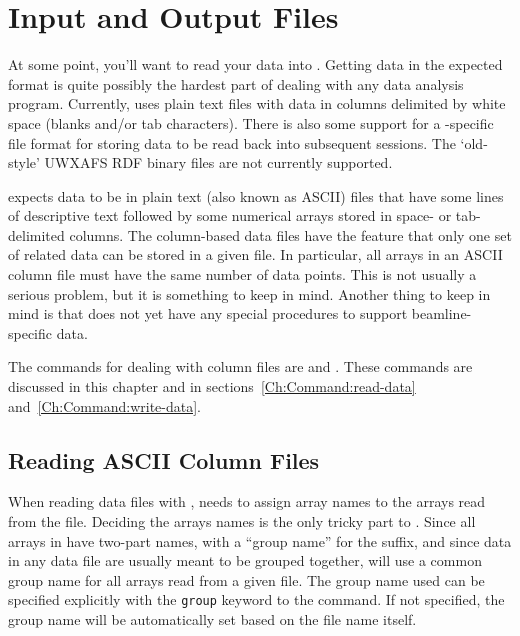 \section{Input and Output Files} \label{Ch:IO}

At some point, you'll want to read your data into {\ifeffit}.  Getting data
in the expected format is quite possibly the hardest part of dealing with
any data analysis program.  Currently, {\ifeffit} uses plain text files
with data in columns delimited by white space (blanks and/or tab
characters).  There is also some support for a {\ifeffit}-specific file
format for storing data to be read back into subsequent {\ifeffit}
sessions.  The `old-style' UWXAFS RDF binary files are not currently
supported.  {}

{\ifeffit} expects data to be in plain text (also known as ASCII) files
that have some lines of descriptive text followed by some numerical arrays
stored in space- or tab-delimited columns.  The column-based data files
have the feature that only one set of related data can be stored in a given
file.  In particular, all arrays in an ASCII column file must have the same
number of data points.  This is not usually a serious problem, but it is
something to keep in mind.  Another thing to keep in mind is that
{\ifeffit} does not yet have any special procedures to support
beamline-specific data.

The commands for dealing with column files are {} and
{}.  These commands are discussed in
this chapter and in sections~{\ref{Ch:Command:read-data}}
and~{\ref{Ch:Command:write-data}}.


\subsection{Reading ASCII Column Files} \label{Ch:IO-READ}

When reading data files with {}, {\ifeffit} needs to
assign array names to the arrays read from the file.  Deciding the arrays
names is the only tricky part to {}.  Since all arrays in
{\ifeffit} have two-part names, with a ``group name'' for the suffix, and
since data in any data file are usually meant to be grouped together,
{\ifeffit} will use a common group name for all arrays read from a given
file.  The group name used can be specified explicitly with the
{\tt{group}} keyword to the {} command.  If not specified,
the group name will be automatically set based on the file name itself.

